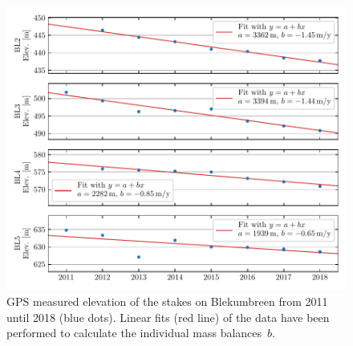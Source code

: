 \begin{figure}[h]
    \centering
    \includegraphics[width=\textwidth]{./figs/Elevation_Blekumbreen.pdf}
    \caption{GPS measured elevation of the stakes on Blekumbreen from 2011 until 2018 (blue dots).
    Linear fits (red line) of the data have been performed to calculate the individual mass balances~$b$.}
    \label{GPS:fig:elev_ble}
\end{figure}


